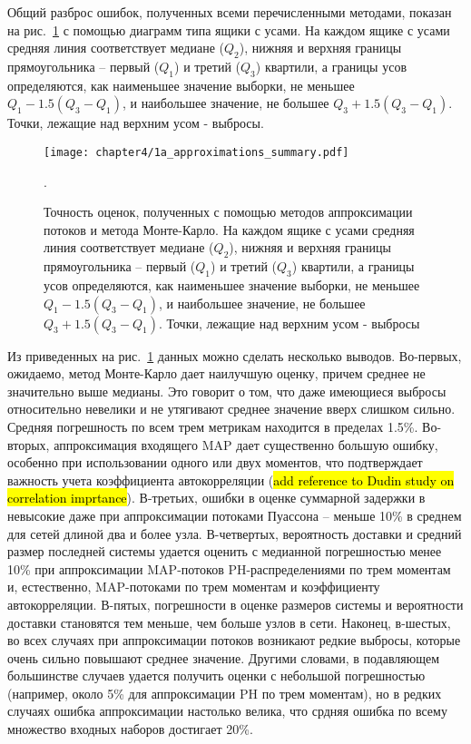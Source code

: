 Общий разброс ошибок, полученных всеми перечисленными методами, показан на рис.~\ref{fig:results-approx-summary} с помощью диаграмм типа ящики с усами. На каждом ящике с усами средняя линия соответствует медиане ($Q_2$), нижняя и верхняя границы прямоугольника -- первый ($Q_1$) и третий ($Q_3$) квартили, а границы усов определяются, как наименьшее значение выборки, не меньшее $Q_1 - 1.5 (Q_3 - Q_1)$, и наибольшее значение, не большее $Q_3 + 1.5 (Q_3 - Q_1)$. Точки, лежащие над верхним усом - выбросы.

\begin{figure}[h]
    \texttt{[image: chapter4/1a\_approximations\_summary.pdf]}
    \caption{Точность оценок, полученных с помощью методов аппроксимации потоков и метода Монте-Карло. На каждом ящике с усами средняя линия соответствует медиане ($Q_2$), нижняя и верхняя границы прямоугольника -- первый ($Q_1$) и третий ($Q_3$) квартили, а границы усов определяются, как наименьшее значение выборки, не меньшее $Q_1 - 1.5 (Q_3 - Q_1)$, и наибольшее значение, не большее $Q_3 + 1.5 (Q_3 - Q_1)$. Точки, лежащие над верхним усом - выбросы}.\label{fig:results-approx-summary}
\end{figure}

Из приведенных на рис.~\ref{fig:results-approx-summary} данных можно сделать несколько выводов. Во-первых, ожидаемо, метод Монте-Карло дает наилучшую оценку, причем среднее не значительно выше медианы. Это говорит о том, что даже имеющиеся выбросы относительно невелики и не утягивают среднее значение вверх слишком сильно. Средняя погрешность по всем трем метрикам находится в пределах 1.5\%. Во-вторых, аппроксимация входящего MAP дает существенно большую ошибку, особенно при использовании одного или двух моментов, что подтверждает важность учета коэффициента автокорреляции (\hl{add reference to Dudin study on correlation imprtance}). В-третьих, ошибки в оценке суммарной задержки в невысокие даже при аппроксимации потоками Пуассона -- меньше 10\% в среднем для сетей длиной два и более узла. В-четвертых, вероятность доставки и средний размер последней системы удается оценить с медианной погрешностью менее 10\% при аппроксимации MAP-потоков PH-распределениями по трем моментам и, естественно, MAP-потоками по трем моментам и коэффициенту автокорреляции. В-пятых, погрешности в оценке размеров системы и вероятности доставки становятся тем меньше, чем больше узлов в сети. Наконец, в-шестых, во всех случаях при аппроксимации потоков возникают редкие выбросы, которые очень сильно повышают среднее значение. Другими словами, в подавляющем большинстве случаев удается получить оценки с небольшой погрешностью (например, около 5\% для аппроксимации PH по трем моментам), но в редких случаях ошибка аппроксимации настолько велика, что срдняя ошибка по всему множество входных наборов достигает 20\%.

